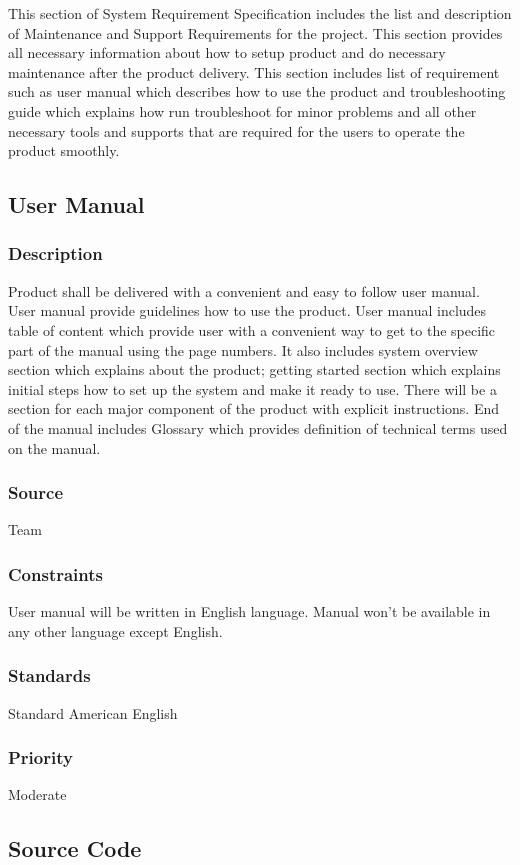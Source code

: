 This section of System Requirement Specification includes the list and description of Maintenance and Support Requirements for the project. This section provides all necessary information about how to setup product and do necessary maintenance after the product delivery. This section includes list of requirement such as user manual which describes how to use the product and troubleshooting guide which explains how run troubleshoot for minor problems and all other necessary tools and supports that are required for the users to operate the product smoothly. 

\subsection{User Manual}
\subsubsection{Description}
Product shall be delivered with a convenient and easy to follow user manual. User manual provide guidelines how to use the product. User manual includes table of content which provide user with a convenient way to get to the specific part of the manual using the page numbers. It also includes system overview section which explains about the product; getting started section which explains initial steps how to set up the system and make it ready to use. There will be a section for each major component of the product with explicit instructions. End of the manual includes Glossary which provides definition of technical terms used on the manual. 
\subsubsection{Source}
Team
\subsubsection{Constraints}
User manual will be written in English language. Manual won't be available in any other language except English. 
\subsubsection{Standards}
Standard American English
\subsubsection{Priority}
Moderate

\subsection{Source Code}
